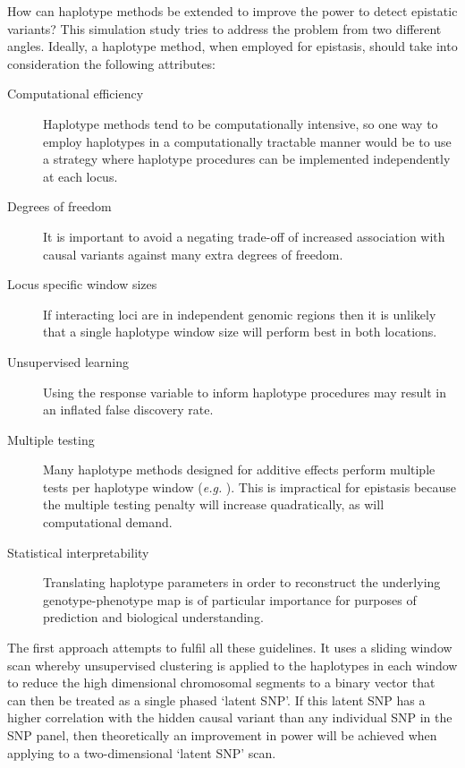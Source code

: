 How can haplotype methods be extended to improve the power to detect epistatic variants? This simulation study tries to address the problem from two different angles. Ideally, a haplotype method, when employed for epistasis, should take into consideration the following attributes:
\begin{description}
\item[Computational efficiency] Haplotype methods tend to be computationally intensive, so one way to employ haplotypes in a computationally tractable manner would be to use a strategy where haplotype procedures can be implemented independently at each locus.
\item[Degrees of freedom] It is important to avoid a negating trade-off of increased association with causal variants against many extra degrees of freedom.
\item[Locus specific window sizes] If interacting loci are in independent genomic regions then it is unlikely that a single haplotype window size will perform best in both locations.
\item[Unsupervised learning] Using the response variable to inform haplotype procedures may result in an inflated false discovery rate.
\item[Multiple testing] Many haplotype methods designed for additive effects perform multiple tests per haplotype window (\emph{e.g.} \citealp{Durrant2004}). This is impractical for epistasis because the multiple testing penalty will increase quadratically, as will computational demand.
\item[Statistical interpretability] Translating haplotype parameters in order to reconstruct the underlying genotype-phenotype map is of particular importance for purposes of prediction and biological understanding.
\end{description}

The first approach attempts to fulfil all these guidelines. It uses a sliding window scan whereby unsupervised clustering is applied to the haplotypes in each window to reduce the high dimensional chromosomal segments to a binary vector that can then be treated as a single phased `latent SNP'. If this latent SNP has a higher correlation with the hidden causal variant than any individual SNP in the SNP panel, then theoretically an improvement in power will be achieved when applying to a two-dimensional `latent SNP' scan.

